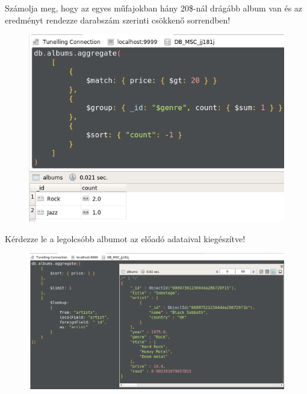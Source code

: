 \documentclass[a4paper, 12pt]{article}
\begin{document}
\noindent Számolja meg, hogy az egyes műfajokban hány 20\$-nál drágább album van és az eredményt rendezze darabszám szerinti csökkenő sorrendben!
\begin{figure}[!hb]
	\centering
	\includegraphics[scale = 0.6]{images/2_e2.png}
	\label{fig:2_e2}
\end{figure}
\newpage
\noindent Kérdezze le a legolcsóbb albumot az előadó adataival kiegészítve!
\begin{figure}[!hb]
	\centering
	\includegraphics[scale = 0.46]{images/2_e3.png}
	\label{fig:2_e3}
\end{figure}
\end{document}
